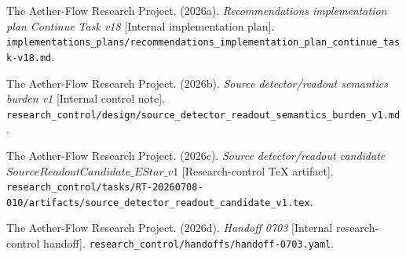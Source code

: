 \documentclass[11pt]{article}
\begin{document}
The Aether-Flow Research Project. (2026a). \emph{Recommendations
implementation plan Continue Task v18} [Internal implementation plan].
\texttt{implementations\_plans/recommendations\_implementation\_plan\_continue\_task-v18.md}.

The Aether-Flow Research Project. (2026b). \emph{Source detector/readout
semantics burden v1} [Internal control note].
\texttt{research\_control/design/source\_detector\_readout\_semantics\_burden\_v1.md}.

The Aether-Flow Research Project. (2026c). \emph{Source detector/readout
candidate \(SourceReadoutCandidate\_EStar\_v1\)} [Research-control TeX
artifact].
\texttt{research\_control/tasks/RT-20260708-010/artifacts/source\_detector\_readout\_candidate\_v1.tex}.

The Aether-Flow Research Project. (2026d). \emph{Handoff 0703}
[Internal research-control handoff].
\texttt{research\_control/handoffs/handoff-0703.yaml}.
\end{document}
